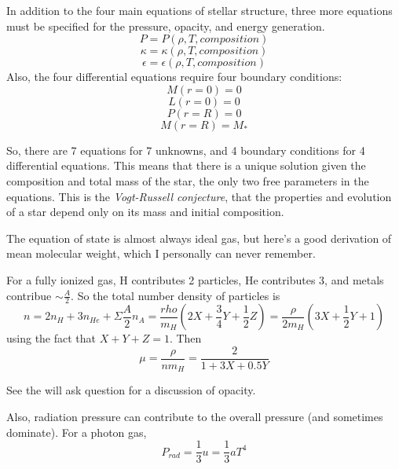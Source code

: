 In addition to the four main equations of stellar structure, three more equations must be 
specified for the pressure, opacity, and energy generation.  
\begin{equation}
P=P(\rho,T,composition)
\end{equation}
\begin{equation}
\kappa=\kappa(\rho,T,composition)
\end{equation}
\begin{equation}
\epsilon=\epsilon(\rho,T,composition)
\end{equation}
Also, the four differential equations require four boundary conditions:
\begin{equation}
M(r=0)=0
\end{equation}
\begin{equation}
L(r=0)=0
\end{equation}
\begin{equation}
P(r=R)=0
\end{equation}
\begin{equation}
M(r=R)=M_*
\end{equation}

So, there are 7 equations for 7 unknowns, and 4 boundary conditions for 4 differential equations.  
This means that there is a unique solution given the composition and total mass of the star, the 
only two free parameters in the equations.  This is the \emph{Vogt-Russell conjecture}, that the 
properties and evolution of a star depend only on its mass and initial composition.

The equation of state is almost always ideal gas, but here's a good derivation of mean molecular 
weight, which I personally can never remember.

For a fully ionized gas, H contributes 2 particles, He contributes 3, and metals contribue 
$\sim\frac{A}{2}$.  So the total number density of particles is
\begin{equation}
n=2n_H+3n_{He}+\Sigma \frac{A}{2}n_A=\frac{rho}{m_H}\left(2X+\frac{3}{4}Y+\frac{1}{2}Z\right)=\frac{\rho}{2m_H}\left(3X+\frac{1}{2}Y+1\right)
\end{equation}
using the fact that $X+Y+Z=1$.  Then
\begin{equation}
\mu=\frac{\rho}{nm_H}=\frac{2}{1+3X+0.5Y}
\end{equation}

See the will ask question for a discussion of opacity.

Also, radiation pressure can contribute to the overall pressure (and sometimes dominate).  
For a photon gas,
\begin{equation}
P_{rad}=\frac{1}{3}u=\frac{1}{3}aT^4
\end{equation}




